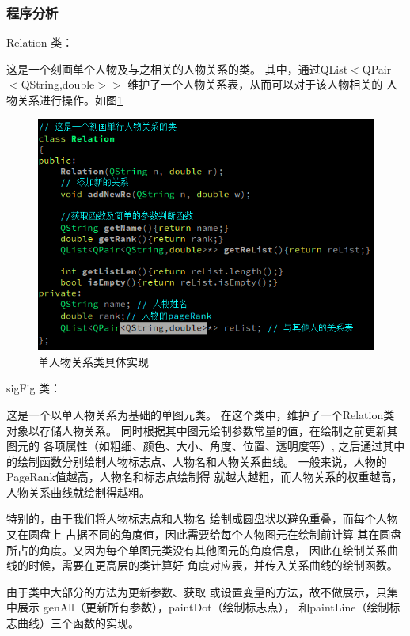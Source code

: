 \documentclass[a4paper,UTF8]{article}
\numberwithin{equation}{section}
\begin{document}
\subsubsection{程序分析}
Relation 类：
\par 这是一个刻画单个人物及与之相关的人物关系的类。
其中，通过QList$<$QPair$<$QString,double$>>$
维护了一个人物关系表，从而可以对于该人物相关的
人物关系进行操作。如图\ref{task6-Relation}
\begin{figure}[htbp]
    \centering
    \includegraphics[width = 15cm]{task6-Relation.png}
    \caption{单人物关系类具体实现}
    \label{task6-Relation}
\end{figure}

\par sigFig 类：
\par 这是一个以单人物关系为基础的单图元类。
在这个类中，维护了一个Relation类对象以存储人物关系。
同时根据其中图元绘制参数常量的值，在绘制之前更新其图元的
各项属性（如粗细、颜色、大小、角度、位置、透明度等）,
之后通过其中的绘制函数分别绘制人物标志点、人物名和人物关系曲线。
一般来说，人物的PageRank值越高，人物名和标志点绘制得
就越大越粗，而人物关系的权重越高，人物关系曲线就绘制得越粗。
\par 特别的，由于我们将人物标志点和人物名
绘制成圆盘状以避免重叠，而每个人物又在圆盘上
占据不同的角度值，因此需要给每个人物图元在绘制前计算
其在圆盘所占的角度。又因为每个单图元类没有其他图元的角度信息，
因此在绘制关系曲线的时候，需要在更高层的类计算好
角度对应表，并传入关系曲线的绘制函数。

\par 由于类中大部分的方法为更新参数、获取
或设置变量的方法，故不做展示，只集中展示
genAll（更新所有参数），paintDot（绘制标志点），
和paintLine（绘制标志曲线）三个函数的实现。
\end{document}
